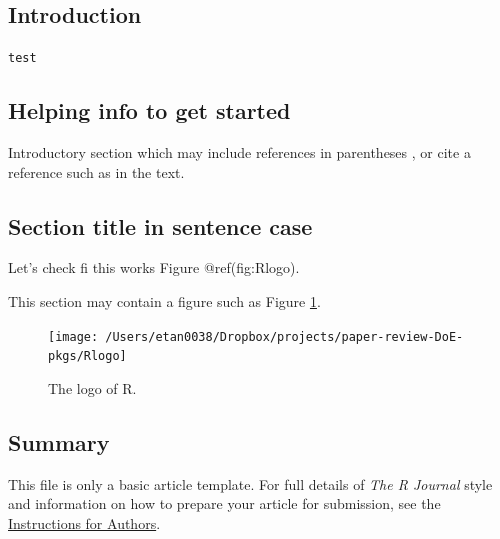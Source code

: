 \hypertarget{introduction-1}{%
\subsection{Introduction}\label{introduction-1}}

\texttt{test} 




\hypertarget{helping-info-to-get-started}{%
\subsection{Helping info to get
started}\label{helping-info-to-get-started}}

Introductory section which may include references in parentheses
\citep{R}, or cite a reference such as \citet{R} in the text.

\hypertarget{section-title-in-sentence-case}{%
\subsection{Section title in sentence
case}\label{section-title-in-sentence-case}}

Let's check fi this works Figure @ref(fig:Rlogo).

This section may contain a figure such as Figure \ref{fig:Rlogo}.

\begin{Schunk}
\begin{figure}[htbp]

{\centering \texttt{[image: /Users/etan0038/Dropbox/projects/paper-review-DoE-pkgs/Rlogo]} 

}

\caption[The logo of R]{The logo of R.}\label{fig:Rlogo}
\end{figure}
\end{Schunk}

\hypertarget{summary}{%
\subsection{Summary}\label{summary}}

This file is only a basic article template. For full details of
\emph{The R Journal} style and information on how to prepare your
article for submission, see the
\href{https://journal.r-project.org/share/author-guide.pdf}{Instructions
for Authors}.

